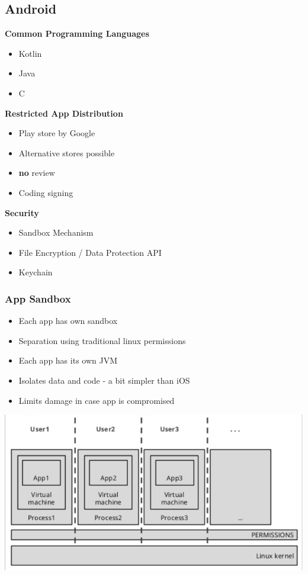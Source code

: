 \subsection{Android}
\textbf{Common Programming Languages}
\begin{itemize}
    \item Kotlin
    \item Java
    \item C
\end{itemize}
\textbf{Restricted App Distribution}
\begin{itemize}
    \item Play store by Google
    \item Alternative stores possible
    \item \textbf{no} review
    \item Coding signing
\end{itemize}
\textbf{Security}
\begin{itemize}
    \item Sandbox Mechanism
    \item File Encryption / Data Protection API
    \item Keychain
\end{itemize}

\subsubsection{App Sandbox}
\begin{itemize}
    \item Each app has own sandbox
    \item Separation using traditional linux permissions
    \item Each app has its own JVM
    \item Isolates data and code - a bit simpler than iOS
    \item Limits damage in case app is compromised
\end{itemize}
\includegraphics[width=0.6\linewidth]{../img/app_sandbox.png}\\

